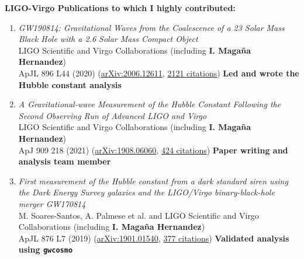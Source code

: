 \documentclass[letterpaper,10pt]{article}
\newcommand{\resheading}[1]{{\large \colorbox{mygrey}{\begin{minipage}{\dimexpr\textwidth-2\fboxsep\relax}{\textbf{#1 \vphantom{p\^{E}}}}\end{minipage}}}}
\newcommand{\publicationLVK}[7]{%
\emph{#1}\\
#2\\
#3 (\href{#4}{#5}, \underline{#6 citations}) \textbf{#7}}
\begin{document}
\resheading{LIGO-Virgo Publications to which I highly contributed:}
\begin{enumerate}

\item
    \publicationLVK{GW190814: Gravitational Waves from the Coalescence of a 23 Solar Mass Black Hole with a 2.6 Solar Mass Compact Object}{LIGO Scientific and Virgo Collaborations (including \textbf{I. Maga\~na Hernandez})}{ApJL 896 L44 (2020)}{https://arxiv.org/abs/2006.12611}{arXiv:2006.12611}{2121}{Led and wrote the Hubble constant analysis}
\item
    \publicationLVK{A Gravitational-wave Measurement of the Hubble Constant Following the Second Observing Run of Advanced LIGO and Virgo}{LIGO Scientific and Virgo Collaborations (including \textbf{I. Maga\~na Hernandez})}{ApJ 909 218 (2021)}{https://arxiv.org/abs/1908.06060}{arXiv:1908.06060}{424}{Paper writing and analysis team member}    
\item
    \publicationLVK{First measurement of the Hubble constant from a dark standard siren using the Dark Energy Survey galaxies and the LIGO/Virgo binary-black-hole merger GW170814}{M. Soares-Santos, A. Palmese et al. and LIGO Scientific and Virgo Collaborations (including \textbf{I. Maga\~na Hernandez})}{ApJL 876 L7 (2019)}{https://arxiv.org/abs/1901.01540}{arXiv:1901.01540}{377}{Validated analysis using \texttt{gwcosmo} }  	

\end{enumerate}
\end{document}
